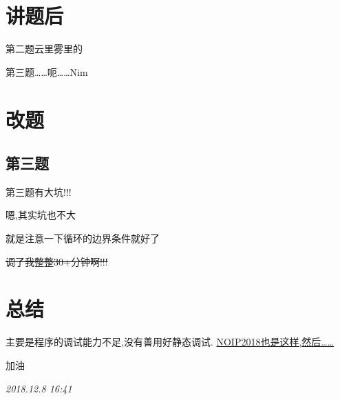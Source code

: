 \documentclass[11pt]{article}
\begin{document}
\section{讲题后}
\label{sec:org213d8c4}
第二题云里雾里的

第三题\ldots{}\ldots{}呃\ldots{}\ldots{}Nim

\section{改题}
\label{sec:org8b64840}
\subsection{第三题}
\label{sec:org7381b6e}
第三题有大坑!!!

嗯,其实坑也不大

就是注意一下循环的边界条件就好了

\sout{调了我整整30+分钟啊!!!}

\section{总结}
\label{sec:org88174bc}
主要是程序的调试能力不足,没有善用好静态调试. \uline{NOIP2018也是这样,然后\ldots{}\ldots{}}

加油

\emph{2018.12.8 16:41}
\end{document}
